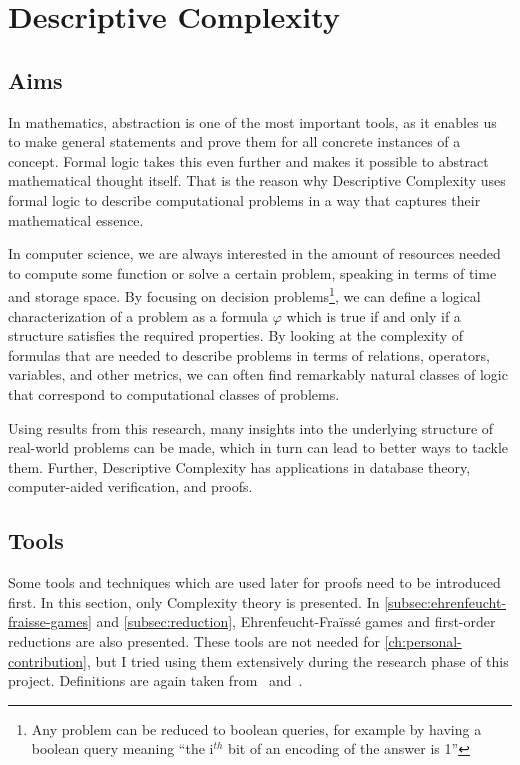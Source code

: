 

\chapter{Descriptive Complexity}\label{ch:descriptive-complexity}


\section{Aims}\label{sec:aims}

In mathematics, abstraction is one of the most important tools, as it enables us to make general statements and prove them for all concrete instances of a concept.
Formal logic takes this even further and makes it possible to abstract mathematical thought itself.
That is the reason why {Descriptive} Complexity uses formal logic to describe computational problems in a way that captures their mathematical essence.

In computer science, we are always interested in the amount of resources needed to compute some function or solve a certain problem, speaking in terms of time and storage space.
By focusing on decision problems\footnote{Any problem can be reduced to boolean queries, for example by having a boolean query meaning ``the i$^{th}$ bit of an encoding of the answer is 1''}, we can define a logical characterization of a problem as a formula $\varphi$ which is true if and only if a structure satisfies the required properties.
By looking at the complexity of formulas that are needed to describe problems in terms of relations, operators, variables, and other metrics, we can often find remarkably natural classes of logic that correspond to computational classes of problems.

Using results from this research, many insights into the underlying structure of real-world problems can be made, which in turn can lead to better ways to tackle them.
Further, Descriptive Complexity has applications in database theory, computer-aided verification, and proofs.


\section{Tools}\label{sec:tools}

Some tools and techniques which are used later for proofs need to be introduced first.
In this section, only Complexity theory is presented.
In \cref{subsec:ehrenfeucht-fraisse-games} and \cref{subsec:reduction},   Ehrenfeucht-Fraïssé games and first-order reductions are also presented.
These tools are not needed for \cref{ch:personal-contribution}, but I tried using them extensively during the research phase of this project.
Definitions are again taken from~\cite{theory-cs} and~\cite{descriptive-complexity}.

